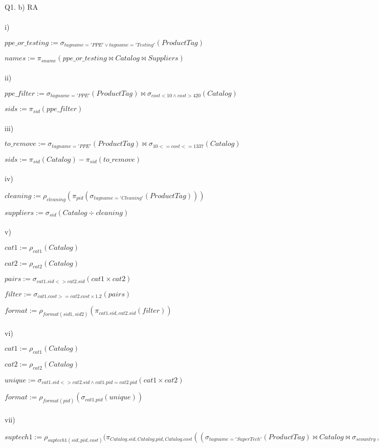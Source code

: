 \documentclass[10pt]{article}
\begin{document}
\section{ }
Q1. b) RA
\\~\\
i)

$ppe\_or\_testing := \sigma_{tagname = 'PPE' \vee tagname = 'Testing'}(ProductTag)$

$names := \pi_{sname}(ppe\_or\_testing \bowtie Catalog \bowtie Suppliers)$
\\~\\
ii)

$ppe\_filter := \sigma_{tagname = 'PPE'}(ProductTag) \bowtie \sigma_{cost < 10 \wedge cost >  420}(Catalog)$

$sids := \pi_{sid}(ppe\_filter)$
\\~\\
iii)

$to\_remove := \sigma_{tagname = 'PPE'}(ProductTag) \bowtie \sigma_{10 <= cost <= 1337}(Catalog)$

$sids := \pi_{sid}(Catalog) - \pi_{sid}(to\_remove)$
\\~\\
iv)

$cleaning := \rho_{cleaning}(\pi_{pid}(\sigma_{tagname = 'Cleaning'}(ProductTag)))$

$suppliers := \sigma_{sid}(Catalog \div cleaning)$
\\~\\
v)

$cat1 := \rho_{cat1}(Catalog)$

$cat2 := \rho_{cat2}(Catalog)$

$pairs := \sigma_{cat1.sid <> cat2.sid}(cat1 \times cat2)$

$filter := \sigma_{cat1.cost >= cat2.cost \times 1.2}(pairs)$

$format := \rho_{format(sid1, sid2)}(\pi_{cat1.sid, cat2.sid}(filter))$
\\~\\
vi)

$cat1 := \rho_{cat1}(Catalog)$

$cat2 := \rho_{cat2}(Catalog)$

$unique := \sigma_{cat1.sid <> cat2.sid \wedge cat1.pid = cat2.pid}(cat1 \times cat2)$

$format := \rho_{format(pid)}(\sigma_{cat1.pid}(unique))$
\\~\\
vii)

$suptech1 := \rho_{suptech1(sid, pid, cost)}(\pi_{Catalog.sid, Catalog.pid, Catalog.cost}((\sigma_{tagname = 'Super Tech'}(ProductTag) \bowtie Catalog \bowtie \sigma_{scountry = 'USA'}(Suppliers)))$
\end{document}
